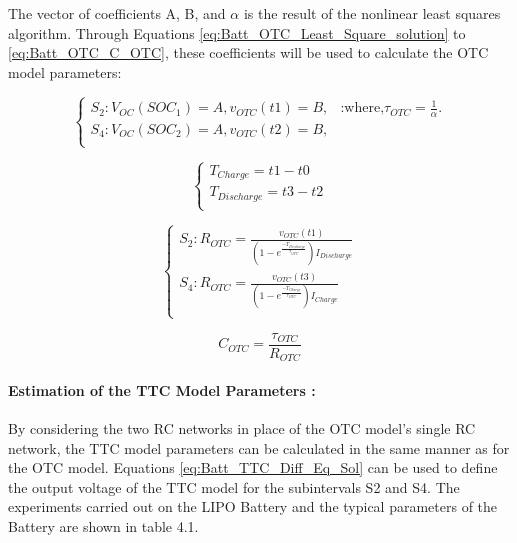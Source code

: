 The vector of coefficients A, B, and $\alpha$ is the result of the nonlinear least squares algorithm. Through Equations \ref{eq:Batt_OTC_Least_Square_solution} to \ref{eq:Batt_OTC_C_OTC}, these coefficients will be used to calculate the OTC model parameters:

\begin{equation}\label{eq:Batt_OTC_Least_Square_solution}
	\begin{cases}
	  S_2 : V_{OC}(SOC_1) = A, v_{OTC}(t1) = B, & \text{:where,} \tau_{OTC} = \frac{1}{\alpha}.\\
	  S_4 : V_{OC}(SOC_2) = A, v_{OTC}(t2) = B,\\
	\end{cases}
\end{equation}

\begin{equation}\label{eq:Batt_OTC_T_charge_discharge}
	\begin{cases}
		T_{Charge} = t1 - t0\\
		T_{Discharge} = t3 - t2 \\
	\end{cases}
\end{equation}

\begin{equation}\label{eq:Batt_OTC_R_OTC}
	\begin{cases}
	  S_2 : R_{OTC} = \frac{v_{OTC}(t1)}{ \left( 1 - e^{\frac{- T_{Discharge} }{\tau_{OTC} }}\right) I_{Discharge}} \\
	  S_4 : R_{OTC} = \frac{v_{OTC}(t3)}{ \left( 1 - e^{\frac{- T_{Charge} }{\tau_{OTC} }}\right) I_{Charge}} \\
	\end{cases}
\end{equation}

\begin{equation}\label{eq:Batt_OTC_C_OTC}
	C_{OTC} = \frac{\tau_{OTC}}{R_{OTC}}
\end{equation}

\paragraph{Estimation of the TTC Model Parameters :} 

By considering the two RC networks in place of the OTC model's single RC network, the TTC model parameters can be calculated in the same manner as for the OTC model. Equations \ref{eq:Batt_TTC_Diff_Eq_Sol} can be used to define the output voltage of the TTC model for the subintervals S2 and S4. The experiments carried out on the LIPO Battery and the typical parameters of the Battery are shown in table 4.1.

